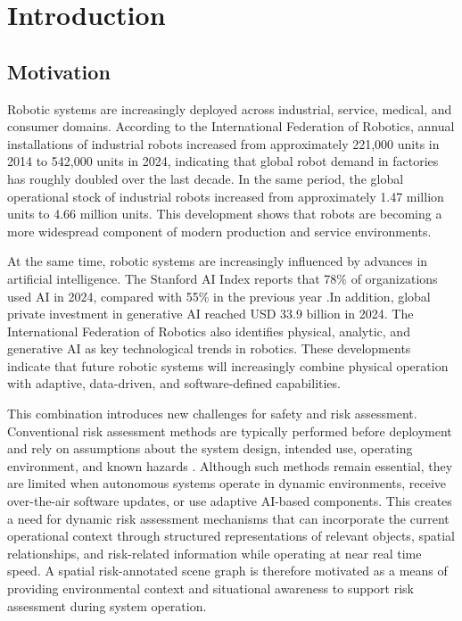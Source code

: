 \chapter{Introduction}

\section{Motivation}
\small{
Robotic systems are increasingly deployed across industrial, service, medical, and consumer domains. According to the International Federation of Robotics, annual installations of industrial robots increased from approximately 221,000 units in 2014 to 542,000 units in 2024, indicating that global robot demand in factories has roughly doubled over the last decade\cite{ifr2025robots}. In the same period, the global operational stock of industrial robots increased from approximately 1.47 million units to 4.66 million units\cite{ifr2025robots}. This development shows that robots are becoming a more widespread component of modern production and service environments.

At the same time, robotic systems are increasingly influenced by advances in artificial intelligence. The Stanford AI Index reports that 78\% of organizations used AI in 2024, compared with 55\% in the previous year \cite{stanford2025aiindex}.In addition, global private investment in generative AI reached USD 33.9 billion in 2024. The International Federation of Robotics also identifies physical, analytic, and generative AI as key technological trends in robotics. These developments indicate that future robotic systems will increasingly combine physical operation with adaptive, data-driven, and software-defined capabilities\cite{ifr2025robots}.

This combination introduces new challenges for safety and risk assessment. Conventional risk assessment methods are typically performed before deployment and rely on assumptions about the system design, intended use, operating environment, and known hazards \cite{iso12100}. Although such methods remain essential, they are limited when autonomous systems operate in dynamic environments, receive over-the-air software updates, or use adaptive AI-based components. This creates a need for dynamic risk assessment mechanisms that can incorporate the current operational context through structured representations of relevant objects, spatial relationships, and risk-related information while operating at near real time speed. A spatial risk-annotated scene graph is therefore motivated as a means of providing environmental context and situational awareness to support risk assessment during system operation.
}
